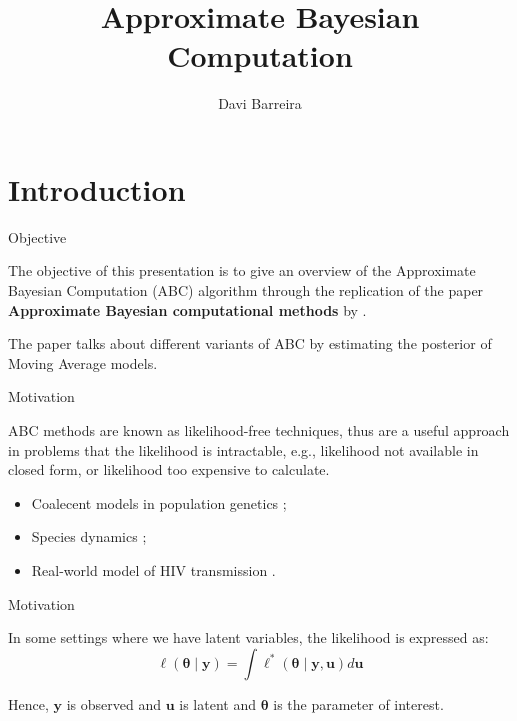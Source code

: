 \documentclass[10pt]{beamer}
\title{Approximate Bayesian Computation}
\subtitle{}
\date{}
\author{Davi Barreira}
\institute{FGV - Escola de Matemática Aplicada}
\begin{document}
\maketitle


\section[Introduction]{Introduction}
\begin{frame}[fragile]{Objective}

  The objective of this presentation is to give an overview of
  the Approximate Bayesian Computation (ABC) algorithm through the
  replication of the
  paper \textbf{Approximate Bayesian computational methods} by
  \cite{Marin2012}.

  The paper talks about different variants of ABC by estimating the
  posterior of Moving Average models.

\end{frame}

\begin{frame}[fragile]{Motivation}

  ABC methods are known as likelihood-free techniques, thus are
  a useful approach in problems that the likelihood is intractable, e.g., likelihood not available in
  closed form, or likelihood too expensive to calculate.
  \begin{itemize}
    \item Coalecent models in population genetics \citep{Tavare505};
    \item Species dynamics \citep{Jabot2016};
    \item Real-world model of HIV transmission \citep{McKinley2018}.
  \end{itemize}

\end{frame}

\begin{frame}[fragile]{Motivation}

  In some settings where we have latent variables, the likelihood is
  expressed as:
  $$\ell(\bm\theta \mid \bm y) =
  \bm\int \ell^*(\bm\theta \mid \bm y, \bm u) d\bm u$$

  Hence, $\bm y$ is observed and $\bm u$ is latent and $\bm\theta$
  is the parameter of interest.

\end{frame}
\end{document}
